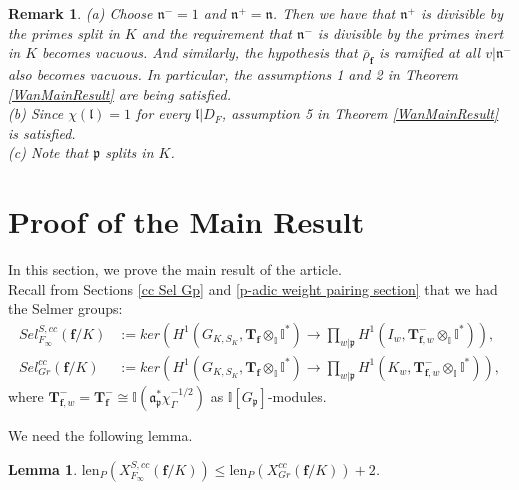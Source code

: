 \documentclass[reqno,10pt]{amsart}
\newcommand{\I}{\mathbb{I}}
\newcommand{\f}{\mathbf{f}}
\newcommand{\T}{\mathbf{T}}
\newcommand{\ma}{\mathfrak{a}}
\newcommand{\p}{\mathfrak{p}}
\newcommand{\n}{\mathfrak{n}}
\newcommand{\orhof}{\overline{\rho}_\f}
\theoremstyle{plain}
\newtheorem{lem}[thm]{Lemma}
\newtheorem{rem}[thm]{Remark}
\theoremstyle{definition}
\begin{document}
\begin{rem}
    (a) Choose $\n^- = 1$ and $\n^+ = \n$. Then we have that $\n^+$ is divisible by the primes split in $K$ and the requirement that $\n^-$ is divisible by the primes inert in $K$ becomes vacuous. And similarly, the hypothesis that $\orhof$ is ramified at all $v|\n^-$ also becomes vacuous. In particular, the assumptions 1 and 2 in Theorem \ref{WanMainResult} are being satisfied.
    \\
    (b) Since $\chi(\mathfrak{l}) = 1$ for every $\mathfrak{l}|D_F$, assumption 5 in Theorem \ref{WanMainResult} is satisfied.
    \\
    (c) Note that $\p$ splits in $K$.
\end{rem}



\section{Proof of the Main Result} 
In this section, we prove the main result of the article.
\\
Recall from Sections \ref{cc Sel Gp} and \ref{p-adic weight pairing section} that we had the Selmer groups:
    \begin{align*}
        Sel^{S,cc}_{F_\infty}(\f/K) & := ker \left(H^1(G_{K,S_K},\T_\f \otimes_\I \I^*) \rightarrow \prod_{w|\p} H^1(I_w,\T_{\f,w}^- \otimes_\I \I^*) \right), \\
        Sel^{cc}_{Gr}(\f/K) & := ker \left(H^1(G_{K,S_K},\T_\f \otimes_\I \I^*) \rightarrow \prod_{w|\mathfrak{p}} H^1(K_w,\T_{\f,w}^- \otimes_\I \I^*) \right),
    \end{align*}
    where $\T_{\f,w}^- = \T_{\f}^- \cong \I(\ma_\p^* \chi_\Gamma^{-1/2})$ as $\I[G_\p]$-modules.
 
We need the following lemma.


\begin{lem} \label{ineq3}
    $\mathrm{len}_P(X^{S,cc}_{F_\infty}(\f/K)) \leq \mathrm{len}_P(X^{cc}_{Gr}(\f/K)) + 2$.
\end{lem}
\end{document}
